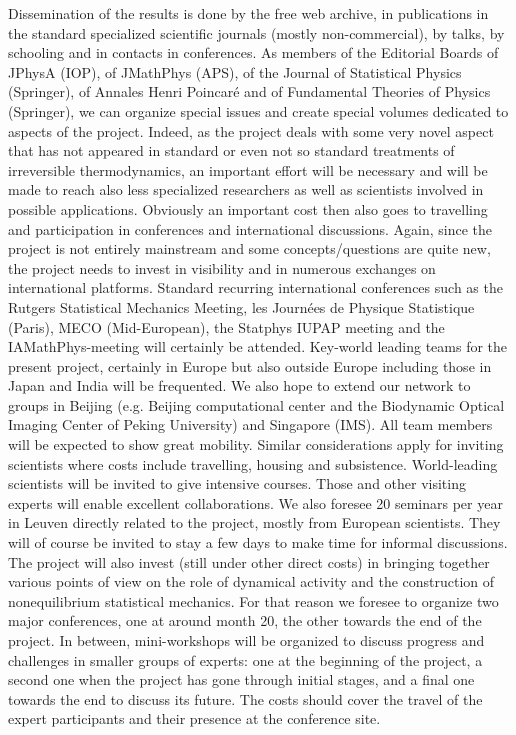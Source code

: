 Dissemination of the results is done by the free web archive, in publications in the standard specialized scientific journals (mostly non-commercial), by talks, by schooling and in contacts in conferences. As members of the Editorial Boards of JPhysA (IOP), of JMathPhys (APS), of the Journal of Statistical Physics (Springer), of Annales Henri Poincar\'e and of Fundamental Theories of Physics (Springer), we can organize special issues and create special volumes dedicated to aspects of the project. Indeed, as the project deals with some very novel aspect that has not appeared in standard or even not so standard treatments of irreversible thermodynamics, an important effort will be necessary and will be made to reach also less specialized researchers as well as scientists involved in possible applications.
Obviously an important cost then also goes to travelling and participation in conferences and international discussions. Again, since the project is not entirely mainstream and some concepts/questions are quite new, the project needs to invest in visibility and in numerous exchanges on international platforms. Standard recurring international conferences such as the Rutgers Statistical Mechanics Meeting, les Journ\'ees de Physique Statistique (Paris), MECO (Mid-European), the Statphys IUPAP meeting and the IAMathPhys-meeting will certainly be attended.  Key-world leading teams for the present project, certainly in Europe but also outside Europe including those in Japan and India will be frequented. We also hope to extend our network to groups in Beijing (e.g. Beijing computational center and the Biodynamic Optical Imaging Center of Peking University) and Singapore (IMS).  All team members will be expected to show great mobility.  Similar considerations apply for inviting scientists where costs include travelling, housing and subsistence. World-leading scientists will be invited to give intensive courses.  Those and other visiting experts will enable excellent collaborations.  We also foresee 20 seminars per year in Leuven directly related to the project, mostly from European scientists. They will of course be invited to stay a few days to make time for informal discussions. The project will also invest (still under other direct costs) in bringing together various points of view on the role of dynamical activity and the construction of nonequilibrium statistical mechanics. For that reason we foresee to organize two major conferences, one at around month 20, the other towards the end of the project.  In between, mini-workshops will be organized to discuss progress and challenges in smaller groups of experts: one at the beginning of the project, a second one when the project has gone through initial stages, and a final one towards the end to discuss its future. The costs should cover the travel of the expert participants and their presence at the conference site.


